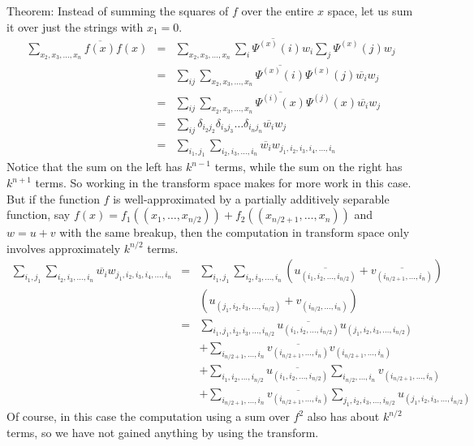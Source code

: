 Theorem:
Instead of summing the squares of $f$ over the entire $x$ space, let us
sum it over just the strings with $x_1=0$.
\begin{eqnarray}
\sum_{x_2,x_3,\ldots,x_n}{\overline{f(x)} f(x)}&=&
        \sum_{x_2,x_3,\ldots,x_n}{\overline{\sum_i{\Psi^{(x)}(i) w_i}}
                \sum_j{\Psi^{(x)}(j) w_j}} \nonumber \\
        &=& \sum_{ij}\sum_{x_2,x_3,\ldots,x_n} {\overline{\Psi^{(x)}(i)}
                \Psi^{(x)}(j)
                \overline{w_i} w_j } \nonumber \\
        &=& \sum_{ij}\sum_{x_2,x_3,\ldots,x_n} {\overline{\Psi^{(i)}{(x)}}
                \Psi^{(j)}(x)
                \overline{w_i} w_j } \nonumber \\
        &=& \sum_{ij} \delta_{i_2 j_2} \delta_{i_3 j_3} \ldots
		\delta_{i_n j_n} \overline{w_i} w_j \nonumber \\
	&=& \sum_{i_1,j_1} \sum_{i_2,i_3,\ldots,i_n}
		\overline{w_i} w_{j_1,i_2,i_3,i_4,\ldots,i_n}
\end{eqnarray}
Notice that the sum on the left has $k^{n-1}$ terms, while the sum on
the right has $k^{n+1}$ terms.  So working in the transform space makes for
more work in this case.  But if the function $f$ is well-approximated by
a partially additively separable function, say $f(x)=f_1((x_1,\ldots,
x_{n/2})) + f_2((x_{n/2+1},\ldots,x_n))$ and $w=u+v$ with the same breakup, 
then the computation in transform space only involves approximately $k^{n/2}$ 
terms.
\begin{eqnarray}
\sum_{i_1,j_1} \sum_{i_2,i_3,\ldots,i_n}
	\overline{w_i} w_{j_1,i_2,i_3,i_4,\ldots,i_n} &=&
\sum_{i_1,j_1} \sum_{i_2,i_3,\ldots,i_n}
(\overline{u_{(i_1,i_2,\ldots,i_{n/2})}} 
+ \overline{v_{(i_{n/2+1},\ldots,i_{n})}}) \nonumber\\
 &&
(u_{(j_1,i_2,i_3,\ldots,i_{n/2})} + v_{(i_{n/2},\ldots,i_n)}) \nonumber \\
&=&
\sum_{i_1,j_1,i_2,i_3,\ldots,i_{n/2}} {
\overline{u_{(i_1,i_2,\ldots,i_{n/2})}} 
u_{(j_1,i_2,i_3,\ldots,i_{n/2})} } \nonumber \\
&&+
\sum_{i_{n/2+1},\ldots,i_n} {
\overline{v_{(i_{n/2+1},\ldots,i_{n})}}
v_{(i_{n/2+1},\ldots,i_n)}
} \nonumber\\
&&+
\sum_{i_1,i_2,\ldots,i_{n/2}} {
\overline{u_{(i_1,i_2,\ldots,i_{n/2})}} }
\sum_{i_{n/2},\ldots,i_n} {
v_{(i_{n/2+1},\ldots,i_n)} } \nonumber\\
&&
+\sum_{i_{n/2+1},\ldots,i_n} {
\overline{v_{(i_{n/2+1},\ldots,i_{n})}} }
\sum_{j_1,i_2,i_3,\ldots,i_{n/2}}
u_{(j_1,i_2,i_3,\ldots,i_{n/2})}
\end{eqnarray}
Of course, in this case the computation using a sum over $f^2$ also has 
about $k^{n/2}$ terms, so we have not gained anything by using the transform.

